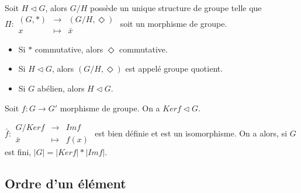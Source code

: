 \begin{prop} Soit $H \lhd G$, alors $G/H$ possède un unique structure de groupe telle que \\$\Pi :\begin{array}{ccc} (G, *) & \rightarrow & (G/H, \Diamond) \\ x & \mapsto & \bar{x}\end{array}$ soit un morphisme de groupe.
\end{prop}

\begin{rem} \begin{itemize}
    \item Si $*$ commutative, alors $\Diamond$ commutative.
    \item Si $H \lhd G$, alors $(G/H, \Diamond)$ est appelé groupe quotient.
    \item Si $G$ abélien, alors $H \lhd G$.
\end{itemize}\end{rem}

\begin{prop} Soit $f:G\rightarrow G'$ morphisme de groupe. On a $Kerf \lhd G$.
\end{prop}

\begin{theo} $\bar{f} : \begin{array}{ccc} G/Kerf & \rightarrow & Imf \\ \bar{x} & \mapsto & f(x)\end{array}$ est bien définie et est un isomorphisme. On a alors, si $G$ est fini, $|G| = |Kerf| * |Imf|$.
\end{theo}

\subsection{Ordre d'un élément}
